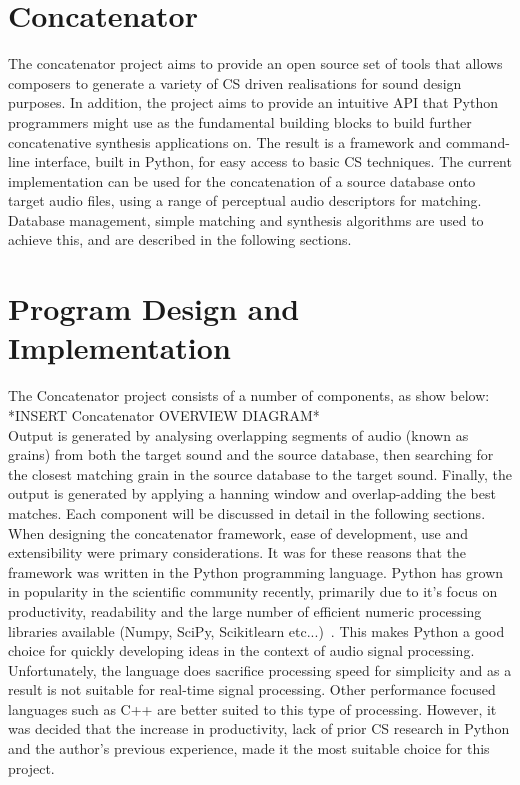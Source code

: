 \documentclass{scrartcl}
\begin{document}
    \section*{Concatenator}
    The concatenator project aims to provide an open source set of tools that
    allows composers to generate a variety of CS driven realisations for
    sound design purposes.  In addition, the project aims to provide an
    intuitive API that Python programmers might use as the fundamental building
    blocks to build further concatenative synthesis applications on.  
    The result is a framework and command-line interface, built in Python, for
    easy access to basic CS techniques.   
    The current implementation can be used for the concatenation of a source
    database onto target audio files, using a range of perceptual audio
    descriptors for matching. Database management, simple matching and
    synthesis algorithms are used to achieve this, and are described in the
    following sections.

    \section*{Program Design and Implementation}
    The Concatenator project consists of a number of components, as show below:\\

    *INSERT Concatenator OVERVIEW DIAGRAM*\\

    Output is generated by analysing overlapping segments of audio (known as
    grains) from both the target sound and the source database, then searching
    for the closest matching grain in the source database to the target sound.
    Finally, the output is generated by applying a hanning window and
    overlap-adding the best matches. Each component will be discussed in detail
    in the following sections.\\

    When designing the concatenator framework, ease of development, use and
    extensibility were primary considerations. It was for these reasons that
    the framework was written in the Python programming language. Python has
    grown in popularity in the scientific community recently, primarily due to
    it's focus on productivity, readability and the large number of efficient
    numeric processing libraries available (Numpy, SciPy, Scikitlearn
    etc...)~\parencite[p.11]{Fangohr2014}. This makes Python a good choice for
    quickly developing ideas in the context of audio signal processing.
    Unfortunately, the language does sacrifice processing speed for simplicity
    and as a result is not suitable for real-time signal processing. Other
    performance focused languages such as C++ are better suited to this type of
    processing. However, it was decided that the increase in productivity, lack
    of prior CS research in Python and the author's previous experience,
    made it the most suitable choice for this project.\\
\end{document}
